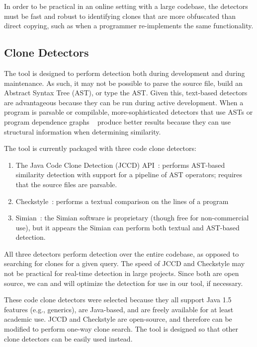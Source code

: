 \documentclass[nocopyrightspace,10pt]{sigplanconf}
\begin{document}
In order to be practical in an online
setting with a large codebase, the detectors must be
fast and
robust to identifying clones that are more obfuscated than direct
copying, such as when a programmer re-implements the same
functionality.

\subsection{Clone Detectors}
The tool is designed to perform detection both during development and
during maintenance.  As such, it may not be possible to parse the source
file, build an Abstract Syntax Tree (AST), or type the AST. Given this, text-based detectors
are advantageous because they can be run during active
development. When a program is parsable or compilable,
more-sophisticated detectors that use ASTs or program
dependence graphs ~\cite{LiE2011} produce better results
because they can use structural information when determining
similarity.

\label{sec:detectors}
The tool is currently packaged with three code clone detectors:

\begin{enumerate}
\item The Java Code Clone Detection (JCCD) API~\cite{JCCD}: performs
  AST-based similarity detection with support for a pipeline of AST
  operators; requires that the source files are parsable.
\item Checkstyle~\cite{CheckStyle}: performs a textual comparison on
  the lines of a program
\item Simian~\cite{Simian}: the Simian software is proprietary (though
  free for non-commercial use), but it appears the Simian can perform
  both textual and AST-based detection.
\end{enumerate}

All three detectors perform detection over the entire codebase, as
opposed to searching for clones for a given query. The speed of JCCD
and Checkstyle may not be practical for real-time detection in large
projects. Since both are open source, we can and will optimize the
detection for use in our tool, if necessary.  

These code clone detectors were selected because they all support Java
1.5 features (e.g., generics), are Java-based, and are freely
available for at least academic use. JCCD and Checkstyle are
open-source, and therefore can be modified to perform one-way clone
search. 
The tool is designed so that other clone detectors can be easily used instead.
\end{document}
